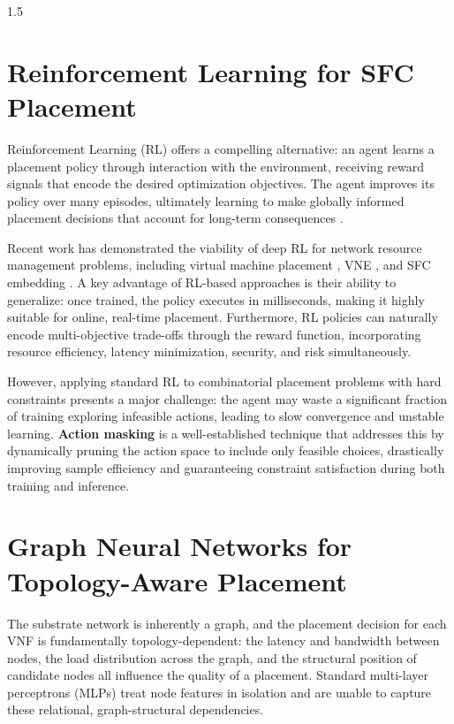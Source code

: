 \documentclass[A4paper,12pt]{report}
\theoremstyle{plain}
\theoremstyle{definition}
\theoremstyle{remark}
\numberwithin{equation}{section}
\begin{document}
\begin{spacing}{1.5}
\section{Reinforcement Learning for SFC Placement}

Reinforcement Learning (RL) offers a compelling alternative: an agent learns a placement policy through interaction with the environment, receiving reward signals that encode the desired optimization objectives. The agent improves its policy over many episodes, ultimately learning to make globally informed placement decisions that account for long-term consequences \cite{mao2016}.

Recent work has demonstrated the viability of deep RL for network resource management problems, including virtual machine placement \cite{mao2016}, VNE \cite{yan2020}, and SFC embedding \cite{heo2020}. A key advantage of RL-based approaches is their ability to generalize: once trained, the policy executes in milliseconds, making it highly suitable for online, real-time placement. Furthermore, RL policies can naturally encode multi-objective trade-offs through the reward function, incorporating resource efficiency, latency minimization, security, and risk simultaneously.

However, applying standard RL to combinatorial placement problems with hard constraints presents a major challenge: the agent may waste a significant fraction of training exploring infeasible actions, leading to slow convergence and unstable learning. \textbf{Action masking} \cite{vinyals2019, huang2020} is a well-established technique that addresses this by dynamically pruning the action space to include only feasible choices, drastically improving sample efficiency and guaranteeing constraint satisfaction during both training and inference.

\section{Graph Neural Networks for Topology-Aware Placement}

The substrate network is inherently a graph, and the placement decision for each VNF is fundamentally topology-dependent: the latency and bandwidth between nodes, the load distribution across the graph, and the structural position of candidate nodes all influence the quality of a placement. Standard multi-layer perceptrons (MLPs) treat node features in isolation and are unable to capture these relational, graph-structural dependencies.


\end{spacing}
\end{document}
